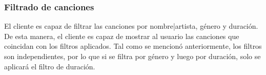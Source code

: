 \subsubsection{Filtrado de canciones}

El cliente es capaz de filtrar las canciones por nombre|artista, género y
duración. De esta manera, el cliente es capaz de mostrar al usuario las
canciones que coincidan con los filtros aplicados. Tal como se mencionó
anteriormente, los filtros son independientes, por lo que si se filtra por
género y luego por duración, solo se aplicará el filtro de duración.